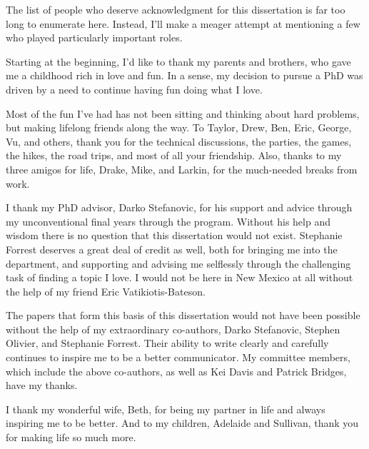 \documentclass[botnum]{unmeethesis}
\begin{document}
\begin{acknowledgments}
  \vspace{1.1in}
  The list of people who deserve acknowledgment for this dissertation is far too
  long to enumerate here. Instead, I'll make a meager attempt at mentioning a
  few who played particularly important roles. 

  Starting at the beginning, I'd like to thank my parents and brothers, who gave
  me a childhood rich in love and fun. In a sense, my decision to pursue a PhD
  was driven by a need to continue having fun doing what I love.  

  Most of the fun I've had has not been sitting and thinking about hard
  problems, but making lifelong friends along the way. To Taylor, Drew, Ben,
  Eric, George, Vu, and others, thank you for the technical discussions, the
  parties, the games, the hikes, the road trips, and most of all your
  friendship. Also, thanks to my three amigos for life, Drake, Mike, and Larkin,
  for the much-needed breaks from work. 

  I thank my PhD advisor, Darko Stefanovic, for his support and advice through
  my unconventional final years through the program. Without his help and
  wisdom there is no question that this dissertation would not exist. Stephanie
  Forrest deserves a great deal of credit as well, both for bringing me into the
  department, and supporting and advising me selflessly through the challenging
  task of finding a topic I love. I would not be here in New Mexico at all
  without the help of my friend Eric Vatikiotis-Bateson. 

  The papers that form this basis of this dissertation would not have been
  possible without the help of my extraordinary co-authors, Darko Stefanovic,
  Stephen Olivier, and Stephanie Forrest. Their ability to write clearly and
  carefully continues to inspire me to be a better communicator. My committee
  members, which include the above co-authors, as well as Kei Davis and Patrick
  Bridges, have my thanks.

  I thank my wonderful wife, Beth, for being my partner in life and always
  inspiring me to be better. And to my children, Adelaide and Sullivan, thank
  you for making life so much more.
\end{acknowledgments}

\maketitleabstract %
\end{document}
